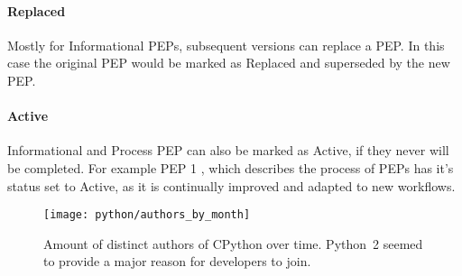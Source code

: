 \paragraph{Replaced}

Mostly for Informational \acp{PEP}, subsequent versions can replace a \ac{PEP}.
In this case the original \ac{PEP} would be marked as Replaced and superseded
by the new \ac{PEP}.

\paragraph{Active}

Informational and Process \ac{PEP} can also be marked as Active, if they never
will be completed. For example \ac{PEP} 1 \cite{Warsaw2000}, which describes
the process of \acp{PEP} has it's status set to Active, as it is continually
improved and adapted to new workflows.

\begin{figure}[htbp]
  \centering
  \texttt{[image: python/authors\_by\_month]}
  \caption{Amount of distinct authors of CPython over time. Python~2 seemed to
  provide a major reason for developers to join.}
\end{figure}


